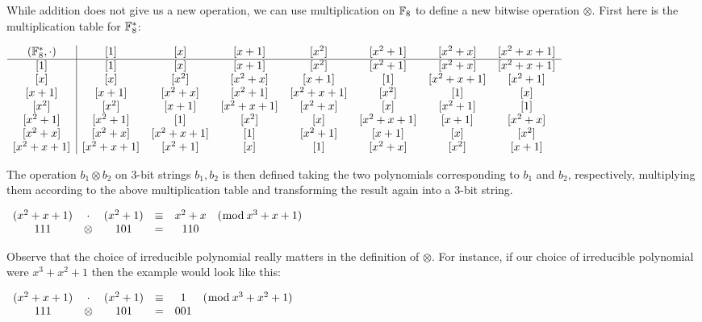 While addition does not give us a new operation, we can use multiplication on
$\mathbb{F}_8$ to define a new bitwise operation $\otimes$.  First here is the
multiplication table for $\mathbb{F}_8^*$:
\begin{center}\small{}
  $\begin{array}{c|ccccccc} 
    {(\mathbb{F}_8^*,\cdot)} & {{[1]}_{}}&{{[x]}_{}}&{{[x+1]}_{}}&{{[x^2]}_{}}&{{[x^2+1]}_{}}&{{[x^2+x]}_{}}&{{[x^2+x+1]}_{}}\\\hline
    {{[1]}_{}}&{{[1]}_{}}&{{[x]}_{}}&{{[x+1]}_{}}&{{[x^2]}_{}}&{{[x^2+1]}_{}}&{{[x^2+x]}_{}}&{{[x^2+x+1]}_{}}\\
    {{[x]}_{}}&{{[x]}_{}}&{{[x^2]}_{}}&{{[x^2+x]}_{}}&{{[x+1]}_{}}&{{[1]}_{}}&{{[x^2+x+1]}_{}}&{{[x^2+1]}_{}}\\
    {{[x+1]}_{}}&{{[x+1]}_{}}&{{[x^2+x]}_{}}&{{[x^2+1]}_{}}&{{[x^2+x+1]}_{}}&{{[x^2]}_{}}&{{[1]}_{}}&{{[x]}_{}}\\
    {{[x^2]}_{}}&{{[x^2]}_{}}&{{[x+1]}_{}}&{{[x^2+x+1]}_{}}&{{[x^2+x]}_{}}&{{[x]}_{}}&{{[x^2+1]}_{}}&{{[1]}_{}}\\
    {{[x^2+1]}_{}}&{{[x^2+1]}_{}}&{{[1]}_{}}&{{[x^2]}_{}}&{{[x]}_{}}&{{[x^2+x+1]}_{}}&{{[x+1]}_{}}&{{[x^2+x]}_{}}\\
    {{[x^2+x]}_{}}&{{[x^2+x]}_{}}&{{[x^2+x+1]}_{}}&{{[1]}_{}}&{{[x^2+1]}_{}}&{{[x+1]}_{}}&{{[x]}_{}}&{{[x^2]}_{}}\\
    {{[x^2+x+1]}_{}}&{{[x^2+x+1]}_{}}&{{[x^2+1]}_{}}&{{[x]}_{}}&{{[1]}_{}}&{{[x^2+x]}_{}}&{{[x^2]}_{}}&{{[x+1]}_{}}\\
  \end{array}$
\end{center}
The operation $b_1\otimes b_2$ on 3-bit strings $b_1,b_2$ is then defined taking
the two polynomials corresponding to $b_1$ and $b_2$,
respectively, multiplying them according to the above multiplication table and
transforming the result again into a 3-bit string.

\example $\begin{array}{cccccccr}
(x^2+x+1) &\cdot & (x^2+1) & \equiv & x^2+x & ({\bmod}\, x^3+x+1)\\
111 & \otimes & 101 & = & 110
\end{array}$

Observe that the choice of irreducible polynomial really matters in the
definition of $\otimes$. For instance, if our choice of irreducible polynomial
were $x^3+x^2+1$ then the example would look like this:

\example $\begin{array}{cccccccr}
(x^2+x+1) &\cdot & (x^2+1) & \equiv & 1 &({\bmod}\, x^3+x^2+1)\\
111 & \otimes & 101 & = & 001
\end{array}$

